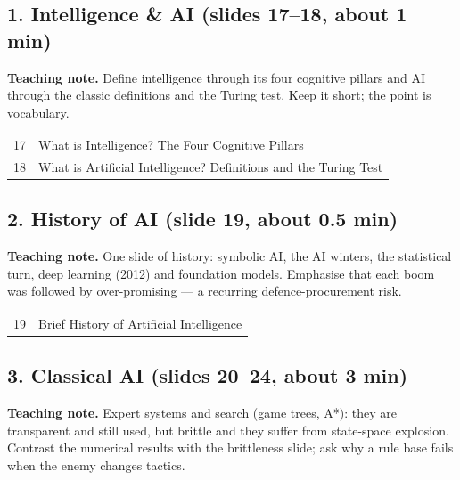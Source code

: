 \documentclass[11pt]{article}
\begin{document}
\subsection{1. Intelligence \& AI \normalfont\small\color{GreyN}(slides 17--18, about 1 min)}

\textbf{Teaching note.} Define intelligence through its four cognitive pillars and AI through the classic definitions and the Turing test. Keep it short; the point is vocabulary.

\begin{center}\small\renewcommand{\arraystretch}{1.1}\begin{tabularx}{\textwidth}{@{}r X@{}}17 & What is Intelligence? The Four Cognitive Pillars\\
18 & What is Artificial Intelligence? Definitions and the Turing Test\\\end{tabularx}\end{center}

\subsection{2. History of AI \normalfont\small\color{GreyN}(slide 19, about 0.5 min)}

\textbf{Teaching note.} One slide of history: symbolic AI, the AI winters, the statistical turn, deep learning (2012) and foundation models. Emphasise that each boom was followed by over-promising --- a recurring defence-procurement risk.

\begin{center}\small\renewcommand{\arraystretch}{1.1}\begin{tabularx}{\textwidth}{@{}r X@{}}19 & Brief History of Artificial Intelligence\\\end{tabularx}\end{center}

\subsection{3. Classical AI \normalfont\small\color{GreyN}(slides 20--24, about 3 min)}

\textbf{Teaching note.} Expert systems and search (game trees, A*): they are transparent and still used, but brittle and they suffer from state-space explosion. Contrast the numerical results with the brittleness slide; ask why a rule base fails when the enemy changes tactics.
\end{document}
